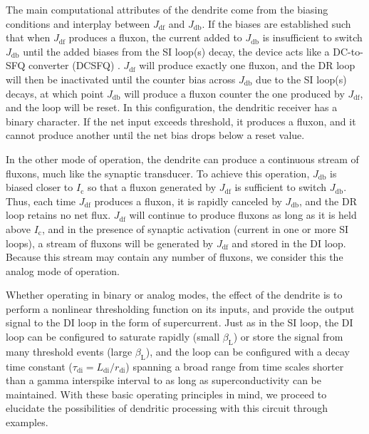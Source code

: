 \documentclass[twocolumn]{article}
\begin{document}
The main computational attributes of the dendrite come from the biasing conditions and interplay between $J_{\mathrm{df}}$ and $J_{\mathrm{db}}$. If the biases are established such that when $J_{\mathrm{df}}$ produces a fluxon, the current added to $J_{\mathrm{db}}$ is insufficient to switch $J_{\mathrm{db}}$ until the added biases from the SI loop(s) decay, the device acts like a DC-to-SFQ converter (DCSFQ) \cite{vatu1998,ka1999}. $J_{\mathrm{df}}$ will produce exactly one fluxon, and the DR loop will then be inactivated until the counter bias across $J_{\mathrm{db}}$ due to the SI loop(s) decays, at which point $J_{\mathrm{db}}$ will produce a fluxon counter the one produced by $J_{\mathrm{df}}$, and the loop will be reset. In this configuration, the dendritic receiver has a binary character. If the net input exceeds threshold, it produces a fluxon, and it cannot produce another until the net bias drops below a reset value.

In the other mode of operation, the dendrite can produce a continuous stream of fluxons, much like the synaptic transducer. To achieve this operation, $J_{\mathrm{db}}$ is biased closer to $I_{\mathrm{c}}$ so that a fluxon generated by $J_{\mathrm{df}}$ is sufficient to switch $J_{\mathrm{db}}$. Thus, each time $J_{\mathrm{df}}$ produces a fluxon, it is rapidly canceled by $J_{\mathrm{db}}$, and the DR loop retains no net flux. $J_{\mathrm{df}}$ will continue to produce fluxons as long as it is held above $I_{\mathrm{c}}$, and in the presence of synaptic activation (current in one or more SI loops), a stream of fluxons will be generated by $J_{\mathrm{df}}$ and stored in the DI loop. Because this stream may contain any number of fluxons, we consider this the analog mode of operation.

Whether operating in binary or analog modes, the effect of the dendrite is to perform a nonlinear thresholding function on its inputs, and provide the output signal to the DI loop in the form of supercurrent. Just as in the SI loop, the DI loop can be configured to saturate rapidly (small $\beta_{\mathrm{L}}$) or store the signal from many threshold events (large $\beta_{\mathrm{L}}$), and the loop can be configured with a decay time constant ($\tau_{\mathrm{di}} = L_{\mathrm{di}} / r_{\mathrm{di}}$) spanning a broad range from time scales shorter than a gamma interspike interval to as long as superconductivity can be maintained. With these basic operating principles in mind, we proceed to elucidate the possibilities of dendritic processing with this circuit through examples.
\end{document}

